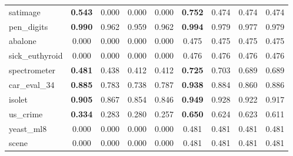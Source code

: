 \begin{figure}[ht]
\begin{tabular}{p{22mm}|*4{p{14mm}}|*4{p{14mm}}}
        satimage&\multicolumn{1}{c}{\textbf{0.543}}&\multicolumn{1}{c}{0.000}&\multicolumn{1}{c}{0.000}&\multicolumn{1}{c|}{0.000}&\multicolumn{1}{c}{\textbf{0.752}}&\multicolumn{1}{c}{0.474}&\multicolumn{1}{c}{0.474}&\multicolumn{1}{c}{0.474}\\
        pen\_digits&\multicolumn{1}{c}{\textbf{0.990}}&\multicolumn{1}{c}{0.962}&\multicolumn{1}{c}{0.959}&\multicolumn{1}{c|}{0.962}&\multicolumn{1}{c}{\textbf{0.994}}&\multicolumn{1}{c}{0.979}&\multicolumn{1}{c}{0.977}&\multicolumn{1}{c}{0.979}\\
        abalone&\multicolumn{1}{c}{0.000}&\multicolumn{1}{c}{0.000}&\multicolumn{1}{c}{0.000}&\multicolumn{1}{c|}{0.000}&\multicolumn{1}{c}{0.475}&\multicolumn{1}{c}{0.475}&\multicolumn{1}{c}{0.475}&\multicolumn{1}{c}{0.475}\\
        sick\_euthyroid&\multicolumn{1}{c}{0.000}&\multicolumn{1}{c}{0.000}&\multicolumn{1}{c}{0.000}&\multicolumn{1}{c|}{0.000}&\multicolumn{1}{c}{0.476}&\multicolumn{1}{c}{0.476}&\multicolumn{1}{c}{0.476}&\multicolumn{1}{c}{0.476}\\
        spectrometer&\multicolumn{1}{c}{\textbf{0.481}}&\multicolumn{1}{c}{0.438}&\multicolumn{1}{c}{0.412}&\multicolumn{1}{c|}{0.412}&\multicolumn{1}{c}{\textbf{0.725}}&\multicolumn{1}{c}{0.703}&\multicolumn{1}{c}{0.689}&\multicolumn{1}{c}{0.689}\\
        car\_eval\_34&\multicolumn{1}{c}{\textbf{0.885}}&\multicolumn{1}{c}{0.783}&\multicolumn{1}{c}{0.738}&\multicolumn{1}{c|}{0.787}&\multicolumn{1}{c}{\textbf{0.938}}&\multicolumn{1}{c}{0.884}&\multicolumn{1}{c}{0.860}&\multicolumn{1}{c}{0.886}\\
        isolet&\multicolumn{1}{c}{\textbf{0.905}}&\multicolumn{1}{c}{0.867}&\multicolumn{1}{c}{0.854}&\multicolumn{1}{c|}{0.846}&\multicolumn{1}{c}{\textbf{0.949}}&\multicolumn{1}{c}{0.928}&\multicolumn{1}{c}{0.922}&\multicolumn{1}{c}{0.917}\\
        us\_crime&\multicolumn{1}{c}{\textbf{0.334}}&\multicolumn{1}{c}{0.283}&\multicolumn{1}{c}{0.280}&\multicolumn{1}{c|}{0.257}&\multicolumn{1}{c}{\textbf{0.650}}&\multicolumn{1}{c}{0.624}&\multicolumn{1}{c}{0.623}&\multicolumn{1}{c}{0.611}\\
        yeast\_ml8&\multicolumn{1}{c}{0.000}&\multicolumn{1}{c}{0.000}&\multicolumn{1}{c}{0.000}&\multicolumn{1}{c|}{0.000}&\multicolumn{1}{c}{0.481}&\multicolumn{1}{c}{0.481}&\multicolumn{1}{c}{0.481}&\multicolumn{1}{c}{0.481}\\
        scene&\multicolumn{1}{c}{0.000}&\multicolumn{1}{c}{0.000}&\multicolumn{1}{c}{0.000}&\multicolumn{1}{c|}{0.000}&\multicolumn{1}{c}{0.481}&\multicolumn{1}{c}{0.481}&\multicolumn{1}{c}{0.481}&\multicolumn{1}{c}{0.481}\\

\end{tabular}
\end{figure}
